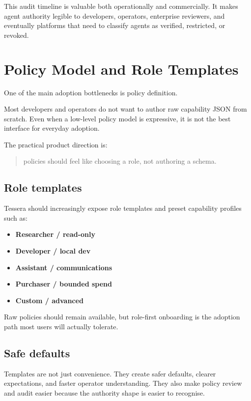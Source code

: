 \documentclass[11pt, a4paper]{article}
\begin{document}
This audit timeline is valuable both operationally and commercially. It makes agent authority legible to developers, operators, enterprise reviewers, and eventually platforms that need to classify agents as verified, restricted, or revoked.

\section{Policy Model and Role Templates}

One of the main adoption bottlenecks is policy definition.

Most developers and operators do not want to author raw capability JSON from scratch. Even when a low-level policy model is expressive, it is not the best interface for everyday adoption.

The practical product direction is:

\begin{quote}
policies should feel like choosing a role, not authoring a schema.
\end{quote}

\subsection{Role templates}

Tessera should increasingly expose role templates and preset capability profiles such as:

\begin{itemize}
  \item \textbf{Researcher / read-only}
  \item \textbf{Developer / local dev}
  \item \textbf{Assistant / communications}
  \item \textbf{Purchaser / bounded spend}
  \item \textbf{Custom / advanced}
\end{itemize}

Raw policies should remain available, but role-first onboarding is the adoption path most users will actually tolerate.

\subsection{Safe defaults}

Templates are not just convenience. They create safer defaults, clearer expectations, and faster operator understanding. They also make policy review and audit easier because the authority shape is easier to recognise.
\end{document}
